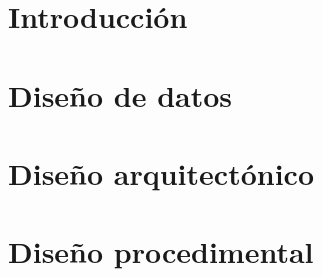 
\section{Introducción}

\section{Diseño de datos}

\section{Diseño arquitectónico}

\section{Diseño procedimental}



